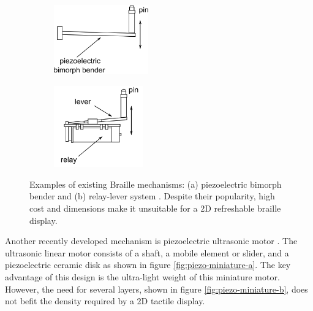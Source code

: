 \begin{figure}[ht] \centering
    \begin{subfigure}[b]{0.4\textwidth}\centering
        \includegraphics[height=3cm]{figures/piezo-bender-a.png}
        \caption{}
        \label{fig:piezo-bender}
    \end{subfigure}
    \begin{subfigure}[b]{0.4\textwidth}\centering
        \includegraphics[height=3.5cm]{figures/piezo-bender-b.png}
        \caption{}
        \label{fig:piezo-relay}
    \end{subfigure}
\caption[Examples of existing Braille mechanisms]{Examples of existing Braille mechanisms: (a) piezoelectric bimorph bender and (b) relay-lever system \cite{hernandez_characterization_2009}. Despite their popularity, high cost and dimensions make it unsuitable for a 2D refreshable braille display.}
\label{fig:piezo-bender-schema}
\end{figure}

Another recently developed mechanism is piezoelectric ultrasonic motor \cite{hernandez_characterization_2009}.
The ultrasonic linear motor consists of a shaft, a mobile element or slider, and a piezoelectric ceramic disk as shown in figure \ref{fig:piezo-miniature-a}.
The key advantage of this design is the ultra-light weight of this miniature motor.
However, the need for several layers, shown in figure \ref{fig:piezo-miniature-b}, does not befit the density required by a 2D tactile display.

